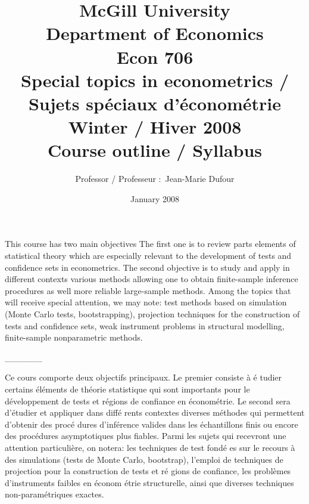 \documentclass[titlepage,11pt,amstex]{article}
\begin{document}
\title{McGill University\\
Department of Economics\\
Econ 706 \\
Special topics in econometrics / Sujets sp\'{e}ciaux d'\'{e}conom\'{e}trie \\
Winter / Hiver 2008\\
Course outline / Syllabus }
\author{Professor / Professeur :\ Jean-Marie Dufour}
\date{January 2008}
\maketitle

\setcounter{page}{1}

This course has two main objectives The first one is to review parts
elements of statistical theory which are especially relevant to the
development of tests and confidence sets in econometrics. The second
objective is to study and apply in different contexts various methods
allowing one to obtain finite-sample inference procedures as well more
reliable large-sample methods. Among the topics that will receive special
attention, we may note: test methods based on simulation (Monte Carlo tests,
bootstrapping), projection techniques for the construction of tests and
confidence sets, weak instrument problems in structural modelling,
finite-sample nonparametric methods.

\begin{center}
\_\_\_\_\_\_
\end{center}

Ce cours comporte deux objectifs principaux. Le premier consiste \`{a} \'{e}%
tudier certains \'{e}l\'{e}ments de th\'{e}orie statistique qui sont
importants pour le d\'{e}veloppement de tests et r\'{e}gions de confiance en 
\'{e}conom\'{e}trie. Le second sera d'\'{e}tudier et appliquer dans diff\'{e}%
rents contextes diverses m\'{e}thodes qui permettent d'obtenir des proc\'{e}%
dures d'inf\'{e}rence valides dans les \'{e}chantillons finis ou encore des
proc\'{e}dures asymptotiques plus fiables. Parmi les sujets qui recevront
une attention particuli\`{e}re, on notera: les techniques de test fond\'{e}%
es sur le recours \`{a} des simulations (tests de Monte Carlo, bootstrap),
l'emploi de techniques de projection pour la construction de tests et r\'{e}%
gions de confiance, les probl\`{e}mes d'instruments faibles en \'{e}conom%
\'{e}trie structurelle, ainsi que diverses techniques non-param\'{e}triques
exactes.
\end{document}
